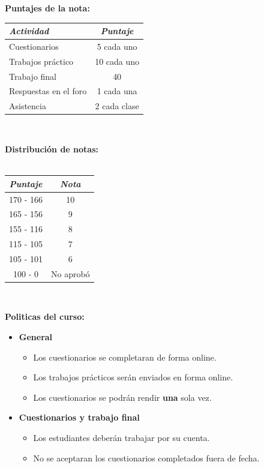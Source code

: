 \documentclass[11pt]{article}
\begin{document}
\newpage
\textbf {\large Puntajes de la nota:} \\
\begin{center}
\begin{tabular}{ l c }
    \emph{Actividad} & \emph{Puntaje} \\
    \hline
Cuestionarios & 5 cada uno\\
Trabajos práctico & 10 cada uno \\
Trabajo final & 40 \\
Respuestas en el foro & 1 cada una\\
Asistencia & 2 cada clase \\
\end{tabular} \\
\end{center}
\textbf {\large Distribuci\'on de notas:} \\\\
\begin{center}
\begin{tabular}{ c  c }
    \emph{Puntaje} & \emph{Nota}\\
    \hline
    170 - 166 & 10 \\ 165 - 156 & 9 \\
    155 - 116 & 8  \\ 115 - 105 & 7 \\
    105 - 101 & 6  \\ 100 -   0 & No aprobó
\end{tabular} \\
\end{center}
\textbf {\large Politicas del curso:}
\begin{itemize}
	\item \textbf {General}
		\begin{itemize}
			\item Los cuestionarios se completaran de forma online.
            \item Los trabajos prácticos serán enviados en forma online.
			\item Los cuestionarios se podrán rendir \textbf{una} sola vez.
		\end{itemize}
	\item \textbf {Cuestionarios y trabajo final}
		\begin{itemize}
			\item Los estudiantes deberán trabajar por su cuenta.
			\item No se aceptaran los cuestionarios completados fuera de fecha.
		\end{itemize}
\end{itemize}
\end{document}
